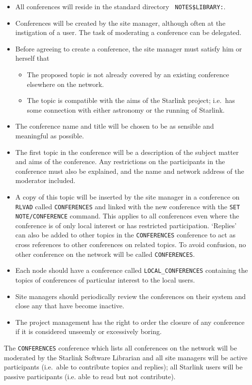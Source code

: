 \begin{itemize}

\item All conferences will reside in the standard directory {\tt
NOTES\$LIBRARY:}.

\item Conferences will be created by the site manager, although often at
the instigation of a user. The task of moderating a conference can be
delegated.

\item Before agreeing to create a conference, the site manager must
satisfy him or herself that
\begin{itemize}
\item The proposed topic is not already covered by an existing conference
elsewhere on the network.
\item The topic is compatible with the aims of the Starlink project; i.e.\
has some connection with either astronomy or the running of Starlink.
\end{itemize}

\item The conference name and title  will be chosen to be as sensible and
meaningful as possible.

\item The first topic in the conference will be a description of the
subject matter and aims of the conference. Any restrictions on the
participants in the conference must also be explained, and the name and
network address of the moderator included.

\item A copy of this topic will be inserted by the site manager in a
conference on {\tt RLVAD} called {\tt CONFERENCES} and linked with the new
conference with the {\tt SET NOTE/CONFERENCE} command. This applies to all
conferences even where the conference is of only local interest or has
restricted participation.  `Replies' can also be added to other topics in the
{\tt CONFERENCES} conference to act as cross references to other conferences on
related topics. To avoid confusion, no other conference on the network will be
called {\tt CONFERENCES}.

\item Each node should have a conference called {\tt LOCAL\_CONFERENCES}
containing the topics of conferences of particular interest to the local
users.

\item Site managers should periodically review the conferences on their
system and close any that have become inactive.

\item The project management has the right to order the closure of any
conference if it is considered unseemly or excessively boring.

\end{itemize}

The {\tt CONFERENCES} conference which lists all conferences on the network
will be moderated by the Starlink Software Librarian and all site managers will
be active participants (i.e.\ able to contribute topics and replies); all
Starlink users will be passive participants (i.e. able to read but not
contribute).


